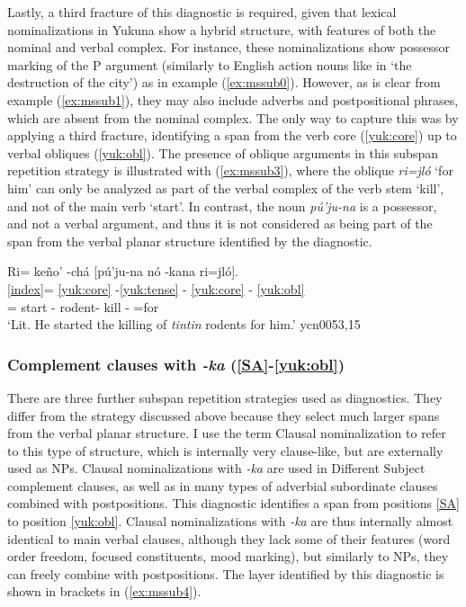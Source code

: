 \documentclass[output=paper]{langscibook}
\begin{document}
Lastly, a third fracture of this diagnostic is required, given that lexical nominalizations in Yukuna show a hybrid structure, with features of both the nominal and verbal complex. For instance, these nominalizations show possessor marking of the P argument (similarly to English action nouns like in `the destruction of the city') as in example (\ref{ex:mssub0}). However, as is clear from example (\ref{ex:mssub1}), they may also include adverbs and postpositional phrases, which are absent from the nominal complex. The only way to capture this was by applying a third fracture, identifying a span from the verb core (\ref{yuk:core}) up to verbal obliques (\ref{yuk:obl}). The presence of oblique arguments in this subspan repetition strategy is illustrated with (\ref{ex:mssub3}), where the oblique \textit{ri=jló} `for him' can only be analyzed as part of the verbal complex of the verb stem `kill', and not of the main verb `start'. In contrast, the noun \textit{pú'ju-na} is a possessor, and not a verbal argument, and thus it is not considered as being part of the span from the verbal planar structure identified by the diagnostic.

\ea \label{ex:mssub3}
    \glll Ri= keño' -chá [pú'ju-na nó -kana ri=jló].  \\
         \ref{index}= \ref{yuk:core} -\ref{yuk:tense} - \ref{yuk:core} -  \ref{yuk:obl} {}\\
        \Tsg{}= start -\Pst{} rodent-\Pl{} kill -\Nmlz{} \Tsg{}=for\\
    \glt `Lit. He started the killing of \textit{tintin} rodents for him.' \hfill ycn0053,15
 \z

\subsubsection{Complement clauses with \textit{-ka} (\ref{SA}-\ref{yuk:obl})} 
There are three further subspan repetition strategies used as diagnostics. They differ from the strategy discussed above because they select much larger spans from the verbal planar structure. I use the term Clausal nominalization to refer to this type of structure, which is internally very clause-like, but are externally used as NPs. Clausal nominalizations with \textit{-ka} are used in Different Subject complement clauses, as well as in many types of adverbial subordinate clauses combined with postpositions. This diagnostic identifies a span from positions \ref{SA} to position \ref{yuk:obl}. Clausal nominalizations with \textit{-ka} are thus internally almost identical to main verbal clauses, although they lack some of their features (word order freedom, focused constituents, mood marking), but similarly to NPs, they can freely combine with postpositions. The layer identified by this diagnostic is shown in brackets in (\ref{ex:mssub4}).
\end{document}
